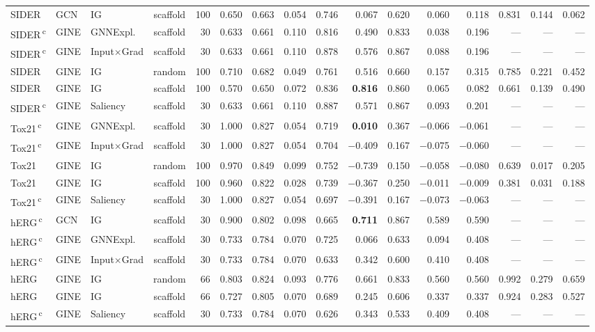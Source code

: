 \begin{table}
{\begin{tabular}{lllcrrrrrrrrrrrr}
SIDER & GCN & IG & scaffold & 100 & 0.650 & 0.663 & 0.054 & 0.746 & 0.067 & 0.620 & 0.060 & 0.118 & 0.831 & 0.144 & 0.062 \\
SIDER\,\textsuperscript{c} & GINE & GNNExpl. & scaffold & 30 & 0.633 & 0.661 & 0.110 & 0.816 & 0.490 & 0.833 & 0.038 & 0.196 & --- & --- & --- \\
SIDER\,\textsuperscript{c} & GINE & Input$\times$Grad & scaffold & 30 & 0.633 & 0.661 & 0.110 & 0.878 & 0.576 & 0.867 & 0.088 & 0.196 & --- & --- & --- \\
SIDER & GINE & IG & random & 100 & 0.710 & 0.682 & 0.049 & 0.761 & 0.516 & 0.660 & 0.157 & 0.315 & 0.785 & 0.221 & 0.452 \\
SIDER & GINE & IG & scaffold & 100 & 0.570 & 0.650 & 0.072 & 0.836 & \textbf{0.816} & 0.860 & 0.065 & 0.082 & 0.661 & 0.139 & 0.490 \\
SIDER\,\textsuperscript{c} & GINE & Saliency & scaffold & 30 & 0.633 & 0.661 & 0.110 & 0.887 & 0.571 & 0.867 & 0.093 & 0.201 & --- & --- & --- \\
\addlinespace[2pt]
Tox21\,\textsuperscript{c} & GINE & GNNExpl. & scaffold & 30 & 1.000 & 0.827 & 0.054 & 0.719 & \textbf{0.010} & 0.367 & $-$0.066 & $-$0.061 & --- & --- & --- \\
Tox21\,\textsuperscript{c} & GINE & Input$\times$Grad & scaffold & 30 & 1.000 & 0.827 & 0.054 & 0.704 & $-$0.409 & 0.167 & $-$0.075 & $-$0.060 & --- & --- & --- \\
Tox21 & GINE & IG & random & 100 & 0.970 & 0.849 & 0.099 & 0.752 & $-$0.739 & 0.150 & $-$0.058 & $-$0.080 & 0.639 & 0.017 & 0.205 \\
Tox21 & GINE & IG & scaffold & 100 & 0.960 & 0.822 & 0.028 & 0.739 & $-$0.367 & 0.250 & $-$0.011 & $-$0.009 & 0.381 & 0.031 & 0.188 \\
Tox21\,\textsuperscript{c} & GINE & Saliency & scaffold & 30 & 1.000 & 0.827 & 0.054 & 0.697 & $-$0.391 & 0.167 & $-$0.073 & $-$0.063 & --- & --- & --- \\
\addlinespace[2pt]
hERG\,\textsuperscript{c} & GCN & IG & scaffold & 30 & 0.900 & 0.802 & 0.098 & 0.665 & \textbf{0.711} & 0.867 & 0.589 & 0.590 & --- & --- & --- \\
hERG\,\textsuperscript{c} & GINE & GNNExpl. & scaffold & 30 & 0.733 & 0.784 & 0.070 & 0.725 & 0.066 & 0.633 & 0.094 & 0.408 & --- & --- & --- \\
hERG\,\textsuperscript{c} & GINE & Input$\times$Grad & scaffold & 30 & 0.733 & 0.784 & 0.070 & 0.633 & 0.342 & 0.600 & 0.410 & 0.408 & --- & --- & --- \\
hERG & GINE & IG & random & 66 & 0.803 & 0.824 & 0.093 & 0.776 & 0.661 & 0.833 & 0.560 & 0.560 & 0.992 & 0.279 & 0.659 \\
hERG & GINE & IG & scaffold & 66 & 0.727 & 0.805 & 0.070 & 0.689 & 0.245 & 0.606 & 0.337 & 0.337 & 0.924 & 0.283 & 0.527 \\
hERG\,\textsuperscript{c} & GINE & Saliency & scaffold & 30 & 0.733 & 0.784 & 0.070 & 0.626 & 0.343 & 0.533 & 0.409 & 0.408 & --- & --- & --- \\
\bottomrule
\end{tabular}}
\end{table}
